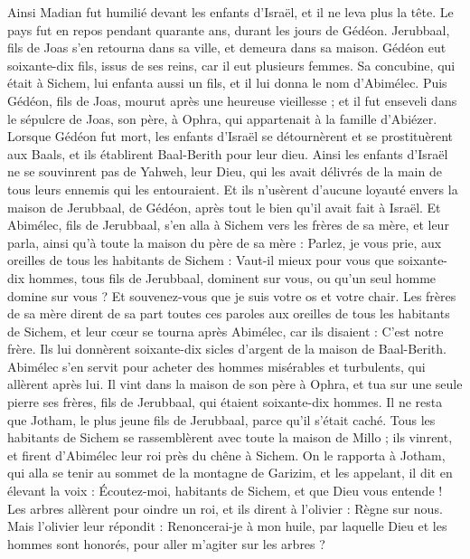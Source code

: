 \begin{multicols}{2}
Ainsi Madian fut humilié devant les enfants d'Israël, et il ne leva plus la tête. Le pays fut en repos pendant quarante ans, durant les jours de Gédéon.
Jerubbaal, fils de Joas s’en retourna dans sa ville, et demeura dans sa maison.
Gédéon eut soixante-dix fils, issus de ses reins, car il eut plusieurs femmes.
Sa concubine, qui était à Sichem, lui enfanta aussi un fils, et il lui donna le nom d’Abimélec.
Puis Gédéon, fils de Joas, mourut après une heureuse vieillesse ; et il fut enseveli dans le sépulcre de Joas, son père, à Ophra, qui appartenait à la famille d’Abiézer.
Lorsque Gédéon fut mort, les enfants d'Israël se détournèrent et se prostituèrent aux Baals, et ils établirent Baal-Berith pour leur dieu.
Ainsi les enfants d'Israël ne se souvinrent pas de Yahweh, leur Dieu, qui les avait délivrés de la main de tous leurs ennemis qui les entouraient.
Et ils n'usèrent d'aucune loyauté envers la maison de Jerubbaal, de Gédéon, après tout le bien qu'il avait fait à Israël.
\VerseOne{}Et Abimélec, fils de Jerubbaal, s'en alla à Sichem vers les frères de sa mère, et leur parla, ainsi qu'à toute la maison du père de sa mère :
Parlez, je vous prie, aux oreilles de tous les habitants de Sichem : Vaut-il mieux pour vous que soixante-dix hommes, tous fils de Jerubbaal, dominent sur vous, ou qu'un seul homme domine sur vous ? Et souvenez-vous que je suis votre os et votre chair.
Les frères de sa mère dirent de sa part toutes ces paroles aux oreilles de tous les habitants de Sichem, et leur cœur se tourna après Abimélec, car ils disaient : C'est notre frère.
Ils lui donnèrent soixante-dix sicles d'argent de la maison de Baal-Berith. Abimélec s'en servit pour acheter des hommes misérables et turbulents, qui allèrent après lui.
Il vint dans la maison de son père à Ophra, et tua sur une seule pierre ses frères, fils de Jerubbaal, qui étaient soixante-dix hommes. Il ne resta que Jotham, le plus jeune fils de Jerubbaal, parce qu'il s'était caché.
Tous les habitants de Sichem se rassemblèrent avec toute la maison de Millo ; ils vinrent, et firent d'Abimélec leur roi près du chêne à Sichem.
On le rapporta à Jotham, qui alla se tenir au sommet de la montagne de Garizim, et les appelant, il dit en élevant la voix : Écoutez-moi, habitants de Sichem, et que Dieu vous entende !
Les arbres allèrent pour oindre un roi, et ils dirent à l'olivier : Règne sur nous.
Mais l'olivier leur répondit : Renoncerai-je à mon huile, par laquelle Dieu et les hommes sont honorés, pour aller m'agiter sur les arbres ?

\end{multicols}
